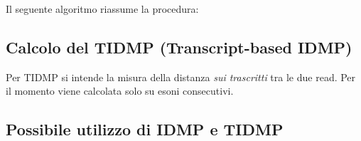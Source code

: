 Il seguente algoritmo riassume la procedura:

\newpage

\subsection{Calcolo del TIDMP (Transcript-based IDMP)}
Per TIDMP si intende la misura della distanza \textit{sui trascritti} tra le due read. Per il momento viene calcolata solo su esoni consecutivi.

\subsection{Possibile utilizzo di IDMP e TIDMP}

\newpage